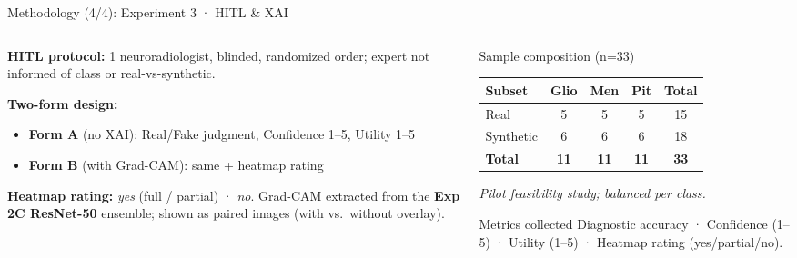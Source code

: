 \documentclass[aspectratio=169]{beamer}
\begin{document}
\begin{frame}{Methodology (4/4): Experiment 3 · HITL \& XAI}
  \footnotesize
  \begin{columns}
    \begin{column}{0.5\textwidth}
      \textbf{HITL protocol:} 1 neuroradiologist, blinded, randomized order;
      expert not informed of class or real-vs-synthetic.

      \vspace{0.4em}
      \textbf{Two-form design:}
      \begin{itemize}\itemsep1pt
        \item \textbf{Form A} (no XAI): Real/Fake judgment, Confidence 1--5, Utility 1--5
        \item \textbf{Form B} (with Grad-CAM): same + heatmap rating
      \end{itemize}

      \vspace{0.4em}
      \textbf{Heatmap rating:} \emph{yes} (full / partial) · \emph{no}.
      Grad-CAM extracted from the \textbf{Exp 2C ResNet-50} ensemble; shown as
      paired images (with vs.\ without overlay).
    \end{column}
    \begin{column}{0.46\textwidth}
      \begin{block}{Sample composition (n=33)}
        \scriptsize
        \begin{tabular}{lccc|c}
          \toprule
          Subset & Glio & Men & Pit & Total \\
          \midrule
          Real        & 5 & 5 & 5 & 15 \\
          Synthetic   & 6 & 6 & 6 & 18 \\
          \midrule
          \textbf{Total} & \textbf{11} & \textbf{11} & \textbf{11} & \textbf{33} \\
          \bottomrule
        \end{tabular}
        \vspace{2pt}
        \scriptsize \textit{Pilot feasibility study; balanced per class.}
      \end{block}
      \vspace{0.4em}
      \begin{exampleblock}{Metrics collected}
        \scriptsize Diagnostic accuracy ·
        Confidence (1--5) · Utility (1--5) ·
        Heatmap rating (yes/partial/no).
      \end{exampleblock}
    \end{column}
  \end{columns}
\end{frame}
\end{document}
